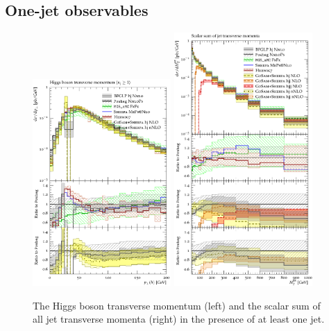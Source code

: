 \clearpage
\subsection{One-jet observables}
\label{sec:hjetscomp:results:1jobs}

\begin{figure}[t!]
  \centering
  \includegraphics[width=0.47\textwidth]{figures/hjetscomp_H_j_pT_incl.pdf}
  \hfill
  \includegraphics[width=0.47\textwidth]{figures/hjetscomp_HT_jets.pdf}
  \caption{
    The Higgs boson transverse momentum (left) and the scalar sum of
    all jet transverse momenta (right) in the presence of at least one jet.
    \label{fig:higgscomp:results:1obs:hpt_ht}
  }
\end{figure}

